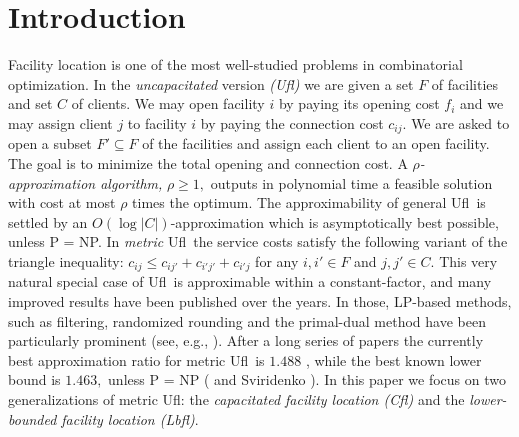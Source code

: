 \documentclass[11pt]{article}
\newcommand{\lbfl}{{\sc Lbfl}}
\newcommand{\cfl}{{\sc Cfl}}
\newcommand{\ufl}{{\sc Ufl}}
\begin{document}
 

\section{Introduction}


Facility location is one of the most well-studied problems in combinatorial optimization.
In the  {\em uncapacitated } version \emph{(\ufl)} we are given a set $F$ of facilities and set $C$ of clients. We may open facility $i$ by paying its opening cost $f_i$ and we may assign client $j$ to facility $i$ by paying the connection cost $c_{ij}$. We are asked to open a subset 
$F' \subseteq F$ of the facilities and  assign each client to an open
facility. The goal is to minimize the total opening and connection
cost. 
A {\em $\rho$-approximation algorithm,} $\rho \geq 1,$ outputs in polynomial time a
feasible solution with cost  at most $\rho$ times the optimum. 
The approximability of general \ufl\ is settled by an $O(\log
|C|)$-approximation \cite{Hochbaum82} which is asymptotically best
possible,  unless {\sf P = NP}. In  {\em metric} \ufl\ 
the service costs satisfy the following variant of the triangle inequality:
$c_{ij} \leq c_{ij'} + c_{i'j'} + c_{i'j}$ for any $i, i'\in F$ and $j, j' \in C.$
This very natural special case of \ufl\ is approximable within a
constant-factor, and many improved results have been published over
the years. In those,   LP-based
methods, such as filtering, randomized rounding and the primal-dual method
 have been particularly prominent (see, e.g., 
\cite{ShmoysWbook}). After a long series of papers 
the currently best approximation ratio for 
 metric \ufl\ is $1.488$ \cite{Li11}, while the best known lower
bound is $1.463,$ unless {\sf P = NP} (\cite{GuhaK99} and Sviridenko \cite{Vygen05}).
In this paper we focus on two generalizations of metric \ufl:  the 
 {\em capacitated facility location (\cfl\/)} and
 the {\em lower-bounded facility location (\lbfl\/)}.
\end{document}
